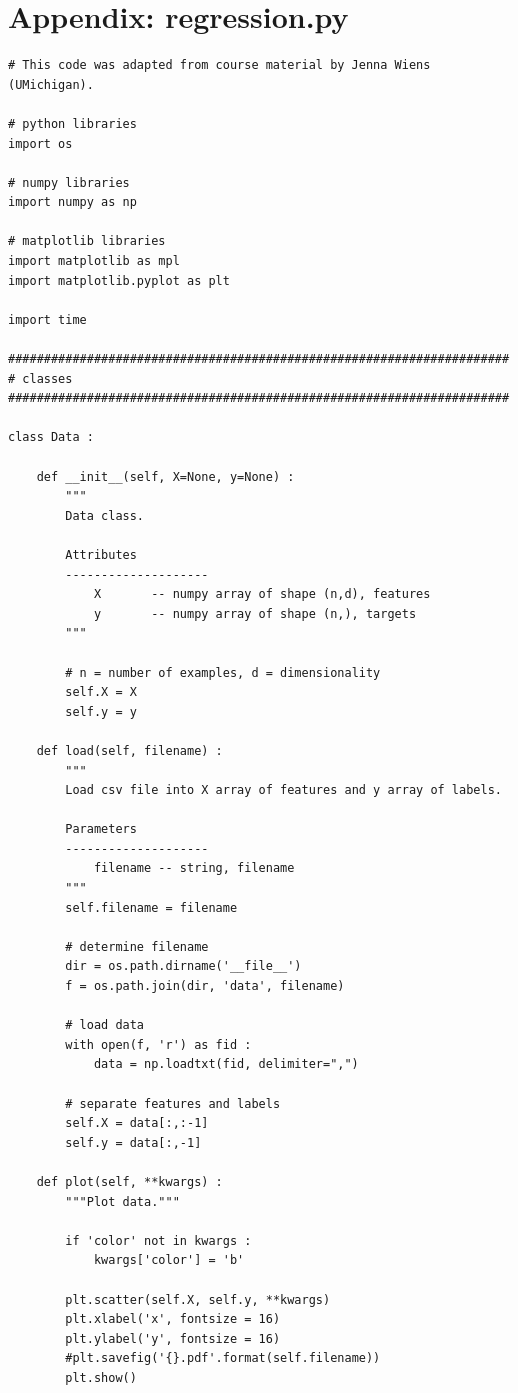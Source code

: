 \documentclass[11pt]{article}
\begin{document}
\section*{Appendix: regression.py}
\begin{verbatim}
# This code was adapted from course material by Jenna Wiens (UMichigan).

# python libraries
import os

# numpy libraries
import numpy as np

# matplotlib libraries
import matplotlib as mpl
import matplotlib.pyplot as plt

import time

######################################################################
# classes
######################################################################

class Data :
    
    def __init__(self, X=None, y=None) :
        """
        Data class.
        
        Attributes
        --------------------
            X       -- numpy array of shape (n,d), features
            y       -- numpy array of shape (n,), targets
        """
        
        # n = number of examples, d = dimensionality
        self.X = X
        self.y = y
    
    def load(self, filename) :
        """
        Load csv file into X array of features and y array of labels.
        
        Parameters
        --------------------
            filename -- string, filename
        """
        self.filename = filename

        # determine filename
        dir = os.path.dirname('__file__')
        f = os.path.join(dir, 'data', filename)
        
        # load data
        with open(f, 'r') as fid :
            data = np.loadtxt(fid, delimiter=",")
        
        # separate features and labels
        self.X = data[:,:-1]
        self.y = data[:,-1]
    
    def plot(self, **kwargs) :
        """Plot data."""
        
        if 'color' not in kwargs :
            kwargs['color'] = 'b'
        
        plt.scatter(self.X, self.y, **kwargs)
        plt.xlabel('x', fontsize = 16)
        plt.ylabel('y', fontsize = 16)
        #plt.savefig('{}.pdf'.format(self.filename))
        plt.show()


\end{verbatim}
\end{document}
